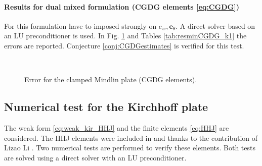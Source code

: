 \paragraph{Results for dual mixed formulation (CGDG elements \eqref{eq:CGDG})}
For this formulation have to imposed strongly on $e_w, \bm{e}_\theta$. A direct solver based on an LU preconditioner is used. In Fig. \ref{fig:errorCGDG} and Tables \ref{tab:resminCGDG_k1} the errors are reported. Conjecture \ref{conj:CGDGestimates} is verified for this test. 

\begin{figure}[htbp]%
	\centering
	\hspace{8pt}%
	 \\
	\hspace{8pt}%
	\caption{Error for the clamped Mindlin plate (CGDG elements).}%
	\label{fig:errorCGDG}%
\end{figure}




\subsection{Numerical test for the Kirchhoff plate}\label{sec:numtest_kir}
The weak form \eqref{eq:weak_kir_HHJ} and the finite elements \eqref{eq:HHJ} are considered. The HHJ elements were included in {} and {} thanks to the contribution of Lizao Li \cite{li2018regge}. Two numerical tests are performed to verify these elements. Both tests are solved using a direct solver with an LU preconditioner. \\ 

